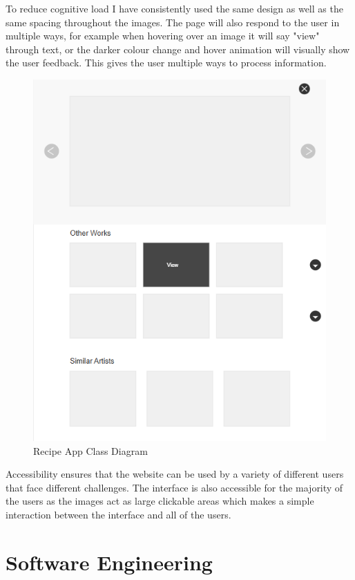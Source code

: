 \documentclass[]{project_interim}
\begin{document}
To reduce cognitive load I have consistently used the same design as well as the same spacing throughout the images. The page will also respond to the user in multiple ways, for example when hovering over an image it will say "view" through text, or the darker colour change and hover animation will visually show the user feedback. This gives the user multiple ways to process information.

\begin{figure}[ht!]
  \centering
  \includegraphics[width=\textwidth]{AG-artist page.png}
  \vspace*{0.0cm}
  \caption{Recipe App Class Diagram}
  \label{fig:1}
\end{figure}

Accessibility ensures that the website can be used by a variety of different users that face different challenges. The interface is also accessible for the majority of the users as the images act as large clickable areas which makes a simple interaction between the interface and all of the users.


\chapter{Software Engineering}
\end{document}
